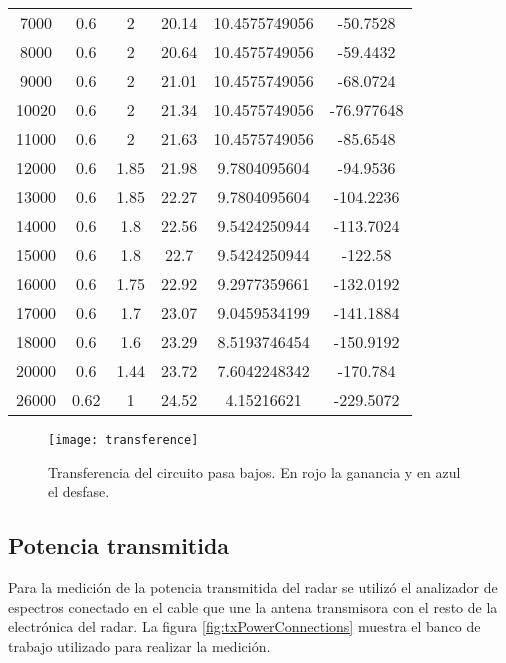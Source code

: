 \begin{table}[H]
\begin{tabular}{*{6}{S[table-number-alignment=center, table-figures-decimal=2, table-auto-round]}}
  7000 & 0.6 & 2 & 20.14 & 10.4575749056 & -50.7528 \tabularnewline

  8000 & 0.6 & 2 & 20.64 & 10.4575749056 & -59.4432 \tabularnewline

  9000 & 0.6 & 2 & 21.01 & 10.4575749056 & -68.0724 \tabularnewline

  10020 & 0.6 & 2 & 21.34 & 10.4575749056 & -76.977648 \tabularnewline

  11000 & 0.6 & 2 & 21.63 & 10.4575749056 & -85.6548 \tabularnewline

  12000 & 0.6 & 1.85 & 21.98 & 9.7804095604 & -94.9536 \tabularnewline

  13000 & 0.6 & 1.85 & 22.27 & 9.7804095604 & -104.2236 \tabularnewline

  14000 & 0.6 & 1.8 & 22.56 & 9.5424250944 & -113.7024 \tabularnewline

  15000 & 0.6 & 1.8 & 22.7 & 9.5424250944 & -122.58 \tabularnewline

  16000 & 0.6 & 1.75 & 22.92 & 9.2977359661 & -132.0192 \tabularnewline

  17000 & 0.6 & 1.7 & 23.07 & 9.0459534199 & -141.1884 \tabularnewline

  18000 & 0.6 & 1.6 & 23.29 & 8.5193746454 & -150.9192 \tabularnewline

  20000 & 0.6 & 1.44 & 23.72 & 7.6042248342 & -170.784 \tabularnewline

  26000 & 0.62 & 1 & 24.52 & 4.15216621 & -229.5072 \tabularnewline
  \bottomrule
  \end{tabular}
\end{table}

\begin{figure}[H]
 \centering
 \texttt{[image: transference]}
 \caption{Transferencia del circuito pasa bajos. En rojo la ganancia y en azul el desfase.}
 \label{fig:lowPassFilterTransference}
\end{figure}



\subsection{Potencia transmitida}

Para la medición de la potencia transmitida del radar se utilizó el analizador de espectros conectado en el cable que une la antena transmisora con el resto de la electrónica del radar. La figura \ref{fig:txPowerConnections} muestra el banco de trabajo utilizado para realizar la medición.

